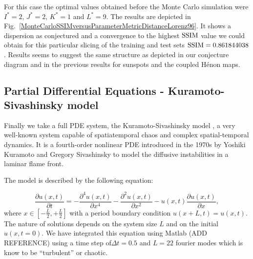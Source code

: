\documentclass[journal]{IEEEtran}
\begin{document}
For this case the optimal values obtained before the Monte Carlo simulation were $I^*=2$, $J^*=2$, $K^*=1$ and $L^*=9$. The results
are depicted in Fig.\ \ref{MonteCarloSSIMversusParameterMetricDistanceLorenz96}.  It shows a dispersion as conjectured and a convergence to the highest $\textnormal{SSIM}$ value we could obtain for this particular slicing of the training and test sets $\textnormal{SSIM}=
0.861844038$. Results seems to suggest the same structure as depicted in our conjecture diagram and in the previous results for sunspots
and the coupled H\'{e}non maps.

\subsection{Partial Differential Equations - Kuramoto-Sivashinsky model}


Finally we take a full PDE system, the Kuramoto-Sivashinsky model \cite{1976PThPh..55..356K,1977AcAau...4.1177S},
a very well-known system capable of spatiatemporal chaos
and complex spatial-temporal dynamics. It is a fourth-order nonlinear PDE introduced in the 1970s by Yoshiki
Kuramoto and Gregory Sivashinsky to model the diffusive instabilities
in a laminar flame front.

The model is described by the following equation:

\begin{equation}
\label{kuramotoSivashinskyequation}
\frac{\partial u(x,t)}{\partial t} = -\frac{\partial^4 u(x,t)}{\partial x^4}-\frac{\partial^2 u(x,t)}{\partial x^2}-u(x,t)
\frac{\partial u(x,t)}{\partial x},
\end{equation}
where $x \in [-\frac{L}{2},+\frac{L}{2}]$ with a period boundary condition 
$u(x+L,t)=u(x,t)$. The nature of solutions depends on the system size $L$ and on the initial $u(x,t=0)$. 
We have integrated this equation using Matlab (ADD REFERENCE)
using a time step of$\Delta t=0.5$ and $L=22$ fourier modes which is know to be ``turbulent'' or chaotic.
\end{document}
